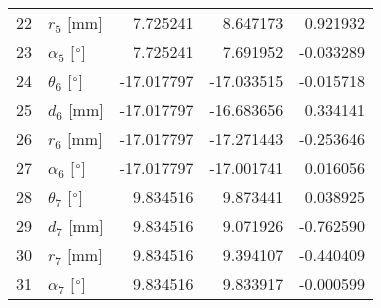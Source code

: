 \documentclass{standalone}%
\begin{document}
\begin{tabular}{llrrr}
22 &              $r_{5}$ [mm] &   7.725241 &   8.647173 &   0.921932 \\
23 &  $\alpha_{5}$ [$\degree$] &   7.725241 &   7.691952 &  -0.033289 \\
24 &  $\theta_{6}$ [$\degree$] & -17.017797 & -17.033515 &  -0.015718 \\
25 &              $d_{6}$ [mm] & -17.017797 & -16.683656 &   0.334141 \\
26 &              $r_{6}$ [mm] & -17.017797 & -17.271443 &  -0.253646 \\
27 &  $\alpha_{6}$ [$\degree$] & -17.017797 & -17.001741 &   0.016056 \\
28 &  $\theta_{7}$ [$\degree$] &   9.834516 &   9.873441 &   0.038925 \\
29 &              $d_{7}$ [mm] &   9.834516 &   9.071926 &  -0.762590 \\
30 &              $r_{7}$ [mm] &   9.834516 &   9.394107 &  -0.440409 \\
31 &  $\alpha_{7}$ [$\degree$] &   9.834516 &   9.833917 &  -0.000599 \\
\bottomrule
\end{tabular}
%
\end{document}
